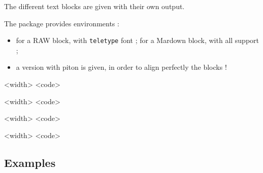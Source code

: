 \documentclass[english,11pt,a4paper]{article}
\begin{document}
The different text blocks are given with their own output.

The package provides environments :

\begin{itemize}
	\item for a \textsf{RAW} block, with \texttt{teletype} font ; for a \textsf{Mardown} block, with all  support ;
	\item a version with \textsf{piton} is given, in order to align perfectly the blocks !
\end{itemize}

\begin{codehigh}[language=latex/latex2,style/main=cyan!10,style/code=cyan!10]
\begin{NotebookRaw}{<width>}
<code>
\end{NotebookRaw}
\end{codehigh}

\begin{codehigh}[language=latex/latex2,style/main=cyan!10,style/code=cyan!10]
\begin{NotebookMarkdown}{<width>}
<code>
\end{NotebookMarkdown}
\end{codehigh}

\begin{codehigh}[language=latex/latex2,style/main=cyan!10,style/code=cyan!10]
\begin{NotebookPitonRaw}{<width>}
<code>
\end{NotebookPitonRaw}
\end{codehigh}

\begin{codehigh}[language=latex/latex2,style/main=cyan!10,style/code=cyan!10]
\begin{NotebookPitonMarkdown}{<width>}
<code>
\end{NotebookPitonMarkdown}
\end{codehigh}

\subsection{Examples}
\end{document}
